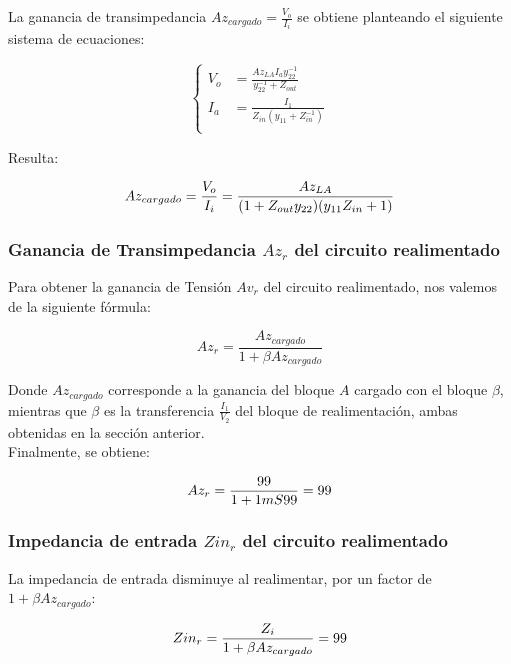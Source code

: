 \documentclass[letterpaper, 10 pt, conference]{ieeeconf}  %
\begin{document}
La ganancia de transimpedancia $Az_{cargado} = \frac{V_o}{I_i}$ se obtiene planteando el siguiente sistema de ecuaciones:

\begin{equation}
\left\{
\begin{aligned}
V_o &= \frac{Az_{LA} I_a y_{22}^{-1}}{y_{22}^{-1}+Z_{out}} \\ 
I_a &= \frac{I_1}{Z_{in}(y_{11}+Z_{in}^{-1})}\\
\end{aligned}
\right.
\end{equation}

Resulta:

\begin{equation}
Az_{cargado} = \frac{V_o}{I_i} =  \frac{Az_{LA}}{(1+Z_{out}y_{22})(y_{11}Z_{in}+1)}\\[1em]
\end{equation}

\subsubsection{Ganancia de Transimpedancia $Az_r$ del circuito realimentado}

Para obtener la ganancia de Tensión $Av_r$ del circuito realimentado, nos valemos de la siguiente fórmula:

\begin{equation}
Az_r = \frac{Az_{cargado}}{1+\beta Az_{cargado}}
\end{equation}

Donde $Az_{cargado}$ corresponde a la ganancia del bloque $A$ cargado con el bloque $\beta$, mientras que $\beta$ es la transferencia $\frac{I_1}{V_2}$ del bloque de realimentación, ambas obtenidas en la sección anterior.\\
Finalmente, se obtiene:

\begin{equation}
Az_r = \frac{99}{1+1mS 99} = 99\\
\end{equation}

\subsubsection{Impedancia de entrada $Zin_{r}$ del circuito realimentado}

La impedancia de entrada disminuye al realimentar, por un factor de $1+\beta Az_{cargado}$:

\begin{equation}
Zin_r = \frac{Z_i}{1+\beta Az_{cargado}} = 99\\
\end{equation}
\end{document}

